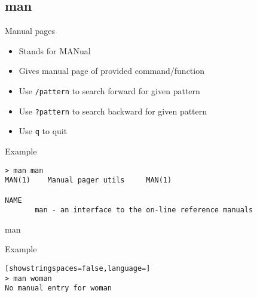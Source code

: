 \subsection{man}

\begin{frame}[fragile]{Manual pages}
  \begin{itemize}
    \pause \item Stands for MANual
    \pause \item Gives manual page of provided command/function
    \pause \item Use \texttt{/pattern} to search forward for given pattern
    \pause \item Use \texttt{?pattern} to search backward for given pattern
    \pause \item Use \texttt{q} to quit
  \end{itemize}
  \pause

  \begin{exampleblock}{Example}
    \begin{lstlisting}[showstringspaces=false,basicstyle=\tiny]
> man man
MAN(1)    Manual pager utils     MAN(1)

NAME
       man - an interface to the on-line reference manuals
    \end{lstlisting}
  \end{exampleblock}
\end{frame}

\begin{frame}[fragile]{man}
  \begin{exampleblock}{Example}
    \begin{lstlisting}[showstringspaces=false,language=]
> man woman
No manual entry for woman
    \end{lstlisting}
  \end{exampleblock}
\end{frame}
